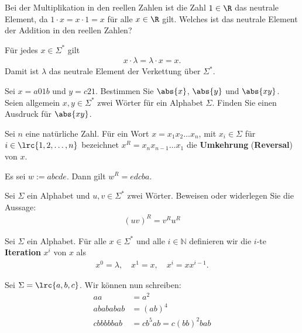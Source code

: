 \begin{myexercise}\label{myexercise:0204}
	Bei der Multiplikation in den reellen Zahlen ist die Zahl $1\in\R$ das neutrale Element, da $1\cdot x = x\cdot 1 = x$ für alle $x\in\R$ gilt.
	Welches ist das neutrale Element der Addition in den reellen Zahlen?
\end{myexercise}

Für jedes $x \in\Sigma^*$ gilt
\begin{align*}
	x\cdot\lambda = \lambda\cdot x = x.
\end{align*}
Damit ist $\lambda$ das neutrale Element der Verkettung über $\Sigma^*$.

\begin{myexercise}\label{myexercise:0205}
	Sei $x = a01b$ und $y = c21$. Bestimmen Sie $\abs{x}$, $\abs{y}$ und $\abs{xy}$.
	Seien allgemein $x,y\in\Sigma^*$ zwei Wörter für ein Alphabet $\Sigma$. Finden Sie einen Ausdruck für $\abs{xy}$.
\end{myexercise}


\begin{mydefinition}\label{mydefinition:reversal}
Sei $n$ eine natürliche Zahl. Für ein Wort $x=x_1x_2\ldots x_n$, mit $x_i\in\Sigma$ für $i\in\lrc{1,2,\ldots ,n}$ bezeichnet $x^R = x_nx_{n-1}\ldots x_1$ die \textbf{Umkehrung} (\textbf{Reversal}) von $x$.
\end{mydefinition}

\begin{myexample}
Es sei $w := abcde$. Dann gilt $w^R = edcba$.
\end{myexample}

\begin{myexercise}\label{myexercise:0206}
	Sei $\Sigma$ ein Alphabet und $u,v\in\Sigma^*$ zwei Wörter. Beweisen oder widerlegen Sie die Aussage:
	\begin{align*}
		(uv)^R = v^Ru^R
	\end{align*}
\end{myexercise}

\begin{mydefinition}\label{mydefinition:Iteration_Wort}
Sei $\Sigma$ ein Alphabet. Für alle $x\in\Sigma^*$ und alle $i\in\mathbb{N}$ definieren wir die $i$-te \textbf{Iteration} $x^i$ von $x$ als
\begin{align*}
	x^0 = \lambda,\quad x^1 = x, \quad x^i = xx^{i-1}.
\end{align*}
\end{mydefinition}
\begin{myexample}
Sei $\Sigma = \lrc{a,b,c}$. Wir können nun schreiben:
\begin{align*}
	aa       & = a^2                 \\
	abababab & = (ab)^4              \\
	cbbbbbab & = cb^5ab = c(bb)^2bab
\end{align*}
\end{myexample}


